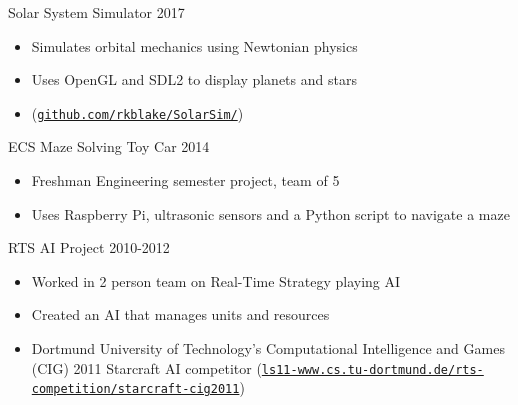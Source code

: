 \documentclass[line,margin]{res}
\begin{document}
\begin{resume}
\vspace{-8pt}
Solar System Simulator
\hfill 2017
	\begin{itemize} \itemsep -2pt
		\item Simulates orbital mechanics using Newtonian physics
		\item Uses OpenGL and SDL2 to display planets and stars
		\item (\href{https://github.com/rkblake/SolarSim/}{\texttt{github.com/rkblake/SolarSim/}})
	\end{itemize}



\vspace{-8pt}
ECS Maze Solving Toy Car
\hfill 2014
	\begin{itemize} \itemsep -2pt
	\item Freshman Engineering semester project, team of 5
	\item Uses Raspberry Pi, ultrasonic sensors and a Python script to navigate a maze
	\end{itemize}

\vspace{-8pt}
RTS AI Project
\hfill 2010-2012
\begin{itemize} \itemsep -2pt
	\item Worked in 2 person team on Real-Time Strategy playing AI
	\item Created an AI that manages units and resources
	\item Dortmund University of Technology’s Computational Intelligence and Games (CIG) 2011 Starcraft AI
	competitor (\href{http://ls11-www.cs.tu-dortmund.de/rts-competition/starcraft-cig2011}{\texttt{ls11-www.cs.tu-dortmund.de/rts-competition/starcraft-cig2011}})
\end{itemize}


\end{resume}
\end{document}
